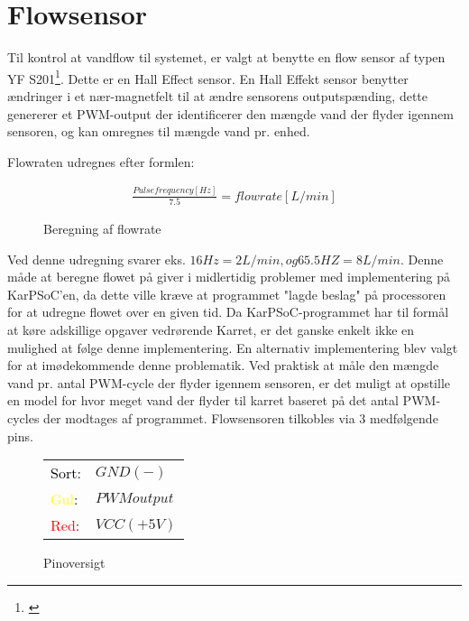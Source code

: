 
\section{Flowsensor}
Til kontrol at vandflow til systemet, er valgt at benytte en flow sensor af typen YF S201\footnote{\citet{nxp:YFS201}}. 
Dette er en Hall Effect sensor. En Hall Effekt sensor benytter ændringer i et nær-magnetfelt til at 
ændre sensorens outputspænding, dette genererer et PWM-output der identificerer den mængde vand 
der flyder igennem sensoren, og kan omregnes til mængde vand pr. enhed.

Flowraten udregnes efter formlen: 
				
\begin{figure}[H]
    \begin{align*}
       \frac{Pulse frequency [Hz]}{7.5} = flowrate[L/min]
    \end{align*}
\label{eq:PWM}
\caption{Beregning af flowrate}
\end{figure}				

Ved denne udregning svarer eks. $16Hz = 2L/min, og 65.5HZ = 8L/min$. \newline
Denne måde at beregne flowet på giver i midlertidig problemer med implementering på KarPSoC'en, da dette ville kræve at programmet "lagde beslag" på processoren for at udregne flowet over en given tid. Da KarPSoC-programmet har til formål at køre adskillige opgaver vedrørende Karret, er det ganske enkelt ikke en mulighed at følge denne implementering.\newline
En alternativ implementering blev valgt for at imødekommende denne problematik. Ved praktisk at måle den mængde vand pr. antal PWM-cycle der flyder igennem sensoren, er det muligt at opstille en model for hvor meget vand der flyder til karret baseret på det antal PWM-cycles der modtages af programmet.\newline
Flowsensoren tilkobles via 3 medfølgende pins.

\begin{figure}[H]
	\begin{center}
		\begin{tabular}{ l l }
			 \textcolor{black}{Sort}:   & $GND(-)$ 		\\ 
			 \textcolor{yellow}{Gul}:   & $PWM output$ 	\\  
			 \textcolor{red}{Red}:    	& $VCC(+5V)$ 	\\
		\end{tabular}
	\end{center}
\caption{Pinoversigt}
\end{figure}

